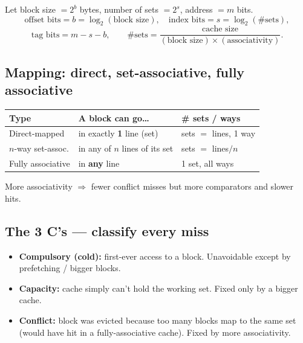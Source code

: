 \documentclass[10pt]{article}
\begin{document}
\begin{formbox}
Let block size $=2^b$ bytes, number of sets $=2^s$, address $=m$ bits.
\[
\text{offset bits}=b=\log_2(\text{block size}),\quad
\text{index bits}=s=\log_2(\text{\# sets}),
\]
\[
\text{tag bits}=m-s-b,\qquad
\#\text{sets}=\frac{\text{cache size}}{(\text{block size})\times(\text{associativity})}.
\]
\end{formbox}

\subsection{Mapping: direct, set-associative, fully associative}
\begin{center}
\renewcommand{\arraystretch}{1.2}
\begin{tabular}{@{}l l l@{}}
\toprule
\textbf{Type} & \textbf{A block can go\dots} & \textbf{\# sets / ways}\\
\midrule
Direct-mapped         & in exactly \textbf{1} line (set)           & sets $=$ lines, 1 way\\
$n$-way set-assoc.    & in any of \textbf{$n$} lines of its set     & sets $=$ lines$/n$\\
Fully associative     & in \textbf{any} line                       & 1 set, all ways\\
\bottomrule
\end{tabular}
\end{center}
More associativity $\Rightarrow$ fewer conflict misses but more comparators and slower hits.

\begin{center}
\end{center}

\subsection{The 3 C's --- classify every miss}
\begin{itemize}
\item \textbf{Compulsory (cold):} first-ever access to a block. Unavoidable except by prefetching /
bigger blocks.
\item \textbf{Capacity:} cache simply can't hold the working set. Fixed only by a bigger cache.
\item \textbf{Conflict:} block was evicted because too many blocks map to the same set (would have
hit in a fully-associative cache). Fixed by more associativity.
\end{itemize}
\end{document}
